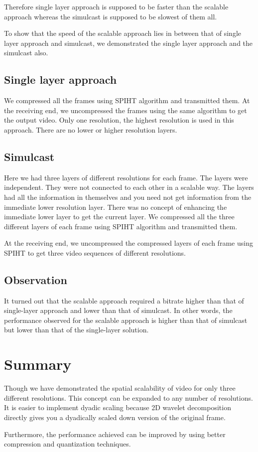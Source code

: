 \documentclass[10pt,twocolumn]{article}
\begin{document}
Therefore single layer approach is supposed to be faster than the scalable approach whereas the simulcast is supposed to be slowest of them all\cite{segall2007}.

To show that the speed of the scalable approach lies in between that of single layer approach and simulcast, we demonstrated the single layer approach and the simulcast also.

\subsection*{Single layer approach}
We compressed all the frames using SPIHT algorithm and transmitted them. At the receiving end, we uncompressed the frames using the same algorithm to get the output video. Only one resolution, the highest resolution is used in this approach. There are no lower or higher resolution layers.

\subsection*{Simulcast}

Here we had three layers of different resolutions for each frame. The layers were independent. They were not connected to each other in a scalable way. The layers had all the information in themselves and you need not get information from the immediate lower resolution layer. There was no concept of enhancing the immediate lower layer to get the current layer. We compressed all the three different layers of each frame using SPIHT algorithm and transmitted them.

At the receiving end, we uncompressed the compressed layers of each frame using SPIHT to get three video sequences of different resolutions.

\subsection*{Observation}
It turned out that the scalable approach required a bitrate higher than that of single-layer approach and lower than that of simulcast. In other words, the performance observed for the scalable approach is higher than that of simulcast but lower than that of the single-layer solution.

\section{Summary}

Though we have demonstrated the spatial scalability of video for only three different resolutions. This concept can be expanded to any number of resolutions. It is easier to implement dyadic scaling because 2D wavelet decomposition directly gives you a dyadically scaled down version of the original frame.

Furthermore, the performance achieved can be improved by using better compression and quantization techniques.



\end{document}
